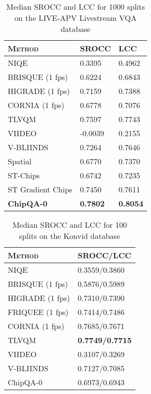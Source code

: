 \documentclass[conference]{IEEEtran}
\begin{document}
\begin{table}
\caption{Median SROCC and LCC for 1000 splits on the LIVE-APV Livestream VQA database}
\begin{center}
\begin{tabular}{|l|l|l|}
\hline
\textsc{Method}  &  SROCC & LCC \\
\hline
NIQE\cite{niqe} & 0.3395 & 0.4962 \\
\hline
BRISQUE\cite{brisque} (1 fps) &  0.6224 & 0.6843 \\
\hline
HIGRADE\cite{higrade} (1 fps) & 0.7159 & 0.7388  \\
\hline
CORNIA\cite{cornia} (1 fps) & 0.6778 & 0.7076  \\
\hline
TLVQM\cite{tlvqm} &  0.7597 & 0.7743\\
\hline
VIIDEO\cite{viideo} & -0.0039 & 0.2155\\
\hline
V-BLIINDS\cite{vbliinds} & 0.7264 & 0.7646 \\
\hhline{|=|=|=|} 
Spatial &  0.6770 & 0.7370 \\
\hline
ST-Chips & 0.6742 & 0.7235 \\
\hline
ST Gradient Chips & 0.7450 & 0.7611 \\
\hhline{|=|=|=|} 
\textbf{ChipQA-0} & \textbf{0.7802} & \textbf{0.8054}  \\
\hline
\end{tabular}
\label{live}
\end{center}
\end{table}

\begin{table}
\caption{Median SROCC and LCC for 100 splits on the Konvid database}
\begin{center}
\begin{tabular}{|l|l|}
\hline
\textsc{Method}  &  SROCC/LCC \\
\hline
NIQE\cite{niqe} & 0.3559/0.3860 \\
\hline
BRISQUE\cite{brisque} (1 fps) & 0.5876/0.5989 \\
\hline
HIGRADE\cite{higrade} (1 fps) & 0.7310/0.7390   \\
\hline
FRIQUEE\cite{friquee} (1 fps) & 0.7414/0.7486   \\
\hline
CORNIA\cite{cornia} (1 fps) & 0.7685/0.7671  \\
\hline
TLVQM\cite{tlvqm} &  \textbf{0.7749/0.7715} \\
\hline
VIIDEO\cite{viideo} & 0.3107/0.3269 \\
\hline
V-BLIINDS\cite{vbliinds} & 0.7127/0.7085 \\
\hline
ChipQA-0 & 0.6973/0.6943  \\
\hline
\end{tabular}
\label{konvid}
\end{center}
\end{table}
\end{document}
